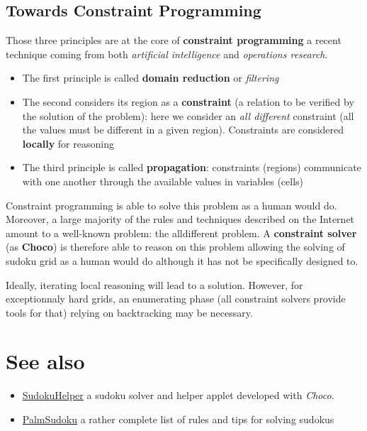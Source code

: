\subsection{Towards Constraint Programming}\label{sudokuandcp:towardsconstraintprogramming}\hypertarget{sudokuandcp:towardsconstraintprogramming}{}

Those three principles are at the core of \textbf{constraint programming} a recent technique coming from both \emph{artificial intelligence} and \emph{operations research}.

\begin{itemize}
	\item The first principle is called \textbf{domain reduction} or \emph{filtering}
	\item The second considers its region as a \textbf{constraint} (a relation to be verified by the solution of the problem): here we consider an \emph{all different} constraint (all the values must be different in a given region). Constraints are considered \textbf{locally} for reasoning
	\item The third principle is called \textbf{propagation}: constraints (regions) communicate with one another through the available values in variables (cells)
\end{itemize}

Constraint programming is able to solve this problem as a human would do. Moreover, a large majority of the rules and techniques described on the Internet amount to a well-known problem: the alldifferent problem. A \textbf{constraint solver} (as \textbf{Choco}) is therefore able to reason on this problem allowing the solving of sudoku grid as a human would do although it has not be specifically designed to.

Ideally, iterating local reasoning will lead to a solution. However, for exceptionnaly hard grids, an enumerating phase (all constraint solvers provide tools for that) relying on backtracking may be necessary.

\section{See also}\label{sudokuandcp:seealso}\hypertarget{sudokuandcp:seealso}{}

\begin{itemize}
	\item \href{http://njussien.e-constraints.net/sudoku/eng-jouer.html}{SudokuHelper} a sudoku solver and helper applet developed with \emph{Choco}.
	\item \href{http://www.palmsudoku.com}{PalmSudoku} a rather complete list of rules and tips for solving sudokus
\end{itemize}
